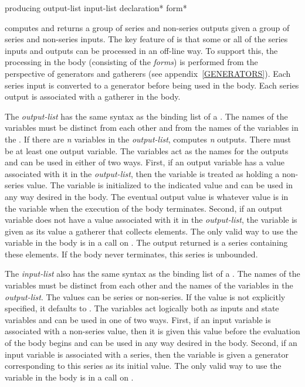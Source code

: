 \begin{defmac}
producing output-list input-list {declaration}* {form}*

 computes and returns a group of series and non-series
outputs given a group of series and non-series inputs.  The key feature of
 is that some or all of the series inputs and outputs can be
processed in an off-line way.  To support this, the processing in the
body (consisting of the \emph{forms}) is performed from the perspective
of generators and gatherers (see
appendix~\ref{GENERATORS}).  Each series input is converted to a generator
before being used in the body.  Each series output is associated with
a gatherer in the body.

The \emph{output-list} has the same syntax as the binding list of a 
.  The names of the variables must be distinct from each other and
from the names of the variables in the .  If there are \emph{n}
variables in the \emph{output-list},  computes \emph{n}
outputs.  There must be at least one output variable.  The variables act as
the names for the outputs and can be used in either of two ways.  First, if
an output variable has a value associated with it in the \emph{output-list},
then the variable is treated as holding a non-series value.  The variable
is initialized to the indicated value and can be used in any way desired in
the body. The eventual output value is whatever value is in the variable
when the execution of the body terminates.  Second, if an output variable
does not have a value associated with it in the \emph{output-list}, the
variable is given as its value a gatherer that collects elements.  The only
valid way to use the variable in the body is in a call on .
The output returned is a series containing these elements.  If the body
never terminates, this series is unbounded.

The \emph{input-list} also has the same syntax as the binding list of a 
.   The names of the variables must be distinct from each other and
the names of the variables in the \emph{output-list}.  The values can be
series or non-series.  If the value is not explicitly specified, it
defaults to .  The variables act logically both as inputs and
state variables and can be used in one of two ways.  First, if an input
variable is associated with a non-series value, then it is given this value
before the evaluation of the body begins and can be used in any way desired
in the body.   Second, if an input variable is associated with a series,
then the variable is given a generator corresponding to this series as its
initial value.  The only valid way to use the variable in the body is in a
call on .


\end{defmac}
